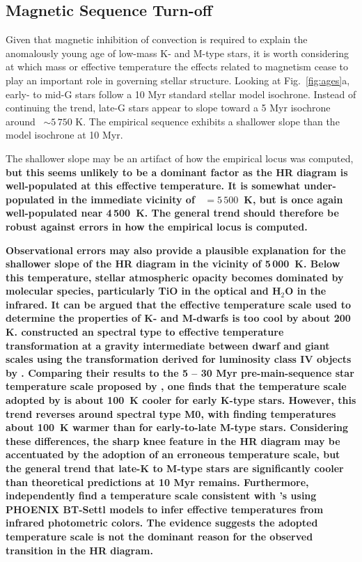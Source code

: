 \documentclass{aa}
\begin{document}
\subsection{Magnetic Sequence Turn-off}
\label{sec:dynamo}

Given that magnetic inhibition of convection is required to explain the anomalously young age of low-mass K- and M-type stars, it is worth considering at which mass or effective temperature the effects related to magnetism cease to play an important role in governing stellar structure. 
Looking at Fig.\ \ref{fig:ages}a, early- to mid-G stars follow a 10 Myr standard stellar model isochrone. Instead of continuing the trend, late-G stars appear to slope toward a 5 Myr isochrone around \teff\ $\sim 5\,750$ K. The empirical sequence exhibits a shallower slope than the model isochrone at 10 Myr.

The shallower slope may be an artifact of how the empirical locus was computed, {\bf but this seems unlikely to be a dominant factor as the HR diagram is well-populated at this effective temperature. It is somewhat under-populated in the immediate vicinity of \teff~$= 5\,500$~K, but is once again well-populated near 4\,500~K. The general trend should therefore be robust against errors in how the empirical locus is computed.}

{\bf Observational errors may also provide a plausible explanation for the shallower slope of the HR diagram in the vicinity of 5\,000~K. Below this temperature, stellar atmospheric opacity becomes dominated by molecular species, particularly TiO in the optical and H$_2$O in the infrared. It can be argued that the effective temperature scale used to determine the properties of K- and M-dwarfs is too cool by about 200 K. \citet{Preibisch1999} constructed an spectral type to effective temperature transformation at a gravity intermediate between dwarf and giant scales using the transformation derived for luminosity class IV objects by \citet{deJager1987}. Comparing their results to the 5 -- 30 Myr pre-main-sequence star temperature scale proposed by \citet{Pecaut2013}, one finds that the temperature scale adopted by \citeauthor{Preibisch1999} is about 100~K cooler for early K-type stars. However, this trend reverses around spectral type M0, with \citeauthor{Preibisch1999} finding temperatures about 100~K warmer than \citet{Pecaut2013} for early-to-late M-type stars. Considering these differences, the sharp knee feature in the HR diagram may be accentuated by the adoption of an erroneous temperature scale, but the general trend that late-K to M-type stars are significantly cooler than theoretical predictions at 10 Myr remains. Furthermore, \citet{Herczeg2015} independently find a temperature scale consistent with \citeauthor{Preibisch1999}'s using PHOENIX BT-Settl models \citep{Allard2011} to infer effective temperatures from infrared photometric colors. The evidence suggests the adopted temperature scale is not the dominant reason for the observed transition in the HR diagram.} 
\end{document}
